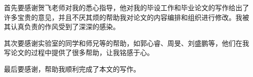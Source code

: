 \begin{ack}
  首先要感谢贺飞老师对我的悉心指导，他对我的毕设工作和毕业论文的写作给出了许多宝贵的意见，并且不厌其烦的帮助我对论文的内容编排和组织进行修改。我被其认真负责的作风受到了深深的感染。
  
  其次要感谢实验室的同学和师兄等的帮助，如郭心睿、周旻、刘盛鹏等，他们在我写论文的过程中提供了很多帮助，让我铭感于心。
  
  最后要感谢\thuthesis，帮助我顺利完成了本文的写作。
\end{ack}